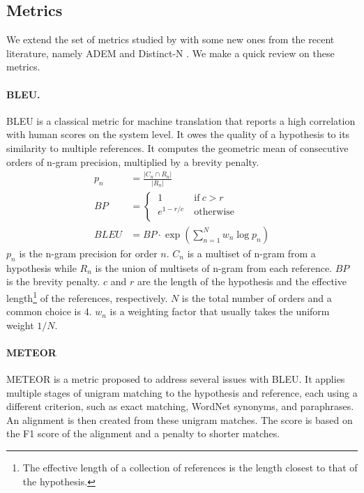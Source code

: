 \documentclass[conference]{IEEEtran}
\begin{document}
\subsection{Metrics}
We extend the set of metrics studied by \cite{HowNot} with some new ones from the recent literature, namely ADEM \cite{ADEM} and Distinct-N \cite{MMI}. We make a quick review on these metrics.

\paragraph{BLEU.}
BLEU \cite{BLEU} is a classical metric for machine translation that reports a high correlation with human scores on the system level. It owes the quality of a hypothesis to its similarity to multiple references. It computes the geometric mean of consecutive orders of n-gram precision, multiplied by a brevity penalty.
\begin{align}
    p_n &= \frac{ |C_n \cap R_n| }{ |R_n| } \\
    \textit{BP} &=
    \begin{cases}
        \ 1 \ & \text{if} \  c > r \\
        \ e^{1 - r/c} \ & \text{otherwise} \\
    \end{cases} \\
    \textit{BLEU} &=
    \textit{BP} \cdot \exp \left( \sum_{n=1}^N w_n \log p_n \right)
\end{align}
$p_n$ is the n-gram precision for order $n$. $C_n$ is a multiset of n-gram from a hypothesis while $R_n$ is the union of multisets of n-gram from each reference. $\textit{BP}$ is the brevity penalty. $c$ and $r$ are the length of the hypothesis and the effective length\footnote{The effective length of a collection of references is the length closest to that of the hypothesis.} of the references, respectively. $N$ is the total number of orders and a common choice is 4. $w_n$ is a weighting factor that usually takes the uniform weight $1 / N$.

\paragraph{METEOR}
METEOR \cite{METEOR} is a metric proposed to address several issues with BLEU. It applies multiple stages of unigram matching to the hypothesis and reference, each using a different criterion, such as exact matching, WordNet synonyms, and paraphrases. An alignment is then created from these unigram matches. The score is based on the F1 score of the alignment and a penalty to shorter matches.
\end{document}
